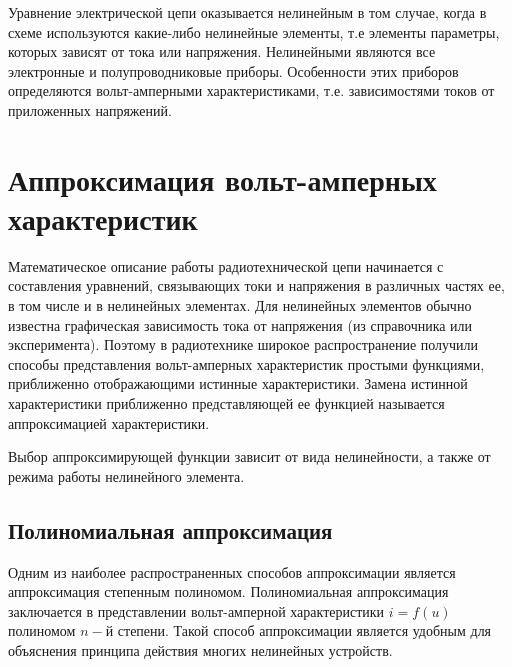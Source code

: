 Уравнение электрической цепи оказывается нелинейным в том случае, когда в схеме используются какие-либо нелинейные элементы, т.е элементы параметры, которых зависят от тока или напряжения. Нелинейными являются все электронные и полупроводниковые приборы. Особенности этих приборов определяются вольт-амперными характеристиками, т.е. зависимостями токов от приложенных напряжений. 
\section{Аппроксимация вольт-амперных характеристик}
Математическое описание работы радиотехнической цепи начинается с составления уравнений, связывающих токи и напряжения в различных частях ее, в том числе и в нелинейных элементах. Для нелинейных элементов обычно известна графическая зависимость тока от напряжения (из справочника или эксперимента). Поэтому в радиотехнике широкое распространение получили способы представления вольт-амперных характеристик простыми функциями, приближенно отображающими истинные характеристики. Замена истинной характеристики приближенно представляющей ее функцией называется аппроксимацией характеристики.

Выбор аппроксимирующей функции зависит от вида нелинейности, а также от режима работы нелинейного элемента.
\subsection{Полиномиальная аппроксимация}
Одним из наиболее распространенных способов аппроксимации является аппроксимация степенным полиномом. Полиномиальная аппроксимация заключается в представлении вольт-амперной характеристики $i=f(u)$ полиномом $n-$й степени. Такой способ аппроксимации является удобным для объяснения принципа действия многих нелинейных устройств.


